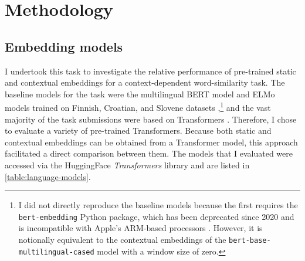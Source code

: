 \section{Methodology}
\label{sec:methodology}

\subsection{Embedding models}

I undertook this task to investigate the relative performance of pre-trained static and
contextual embeddings for a context-dependent word-similarity task.
The baseline models for the task were the multilingual BERT model
\parencite{Devlin2019} and ELMo models \parencite{Peters2018a} trained on Finnish,
Croatian, and Slovene datasets \parencite{Ulcar2020a},\footnote{I did not directly
  reproduce the baseline models because the first requires the \texttt{bert-embedding}
  Python package, which has been deprecated since 2020 and is incompatible with Apple's
  ARM-based processors \parencite{Lai2023}.
  However, it is notionally equivalent to the contextual embeddings of the
  \texttt{bert-base-multilingual-cased} model with a window size of zero.
} and the vast majority of the task
submissions were based on Transformers \parencite[36,42-45]{Armendariz2020a}.
Therefore, I chose to evaluate a variety of pre-trained Transformers.
Because both static and contextual embeddings can be obtained from a Transformer model,
this approach facilitated a direct comparison between them.
The models that I evaluated were accessed via the HuggingFace \emph{Transformers}
library \parencite{Wolf2020a} and are listed in \cref{table:language-models}.

